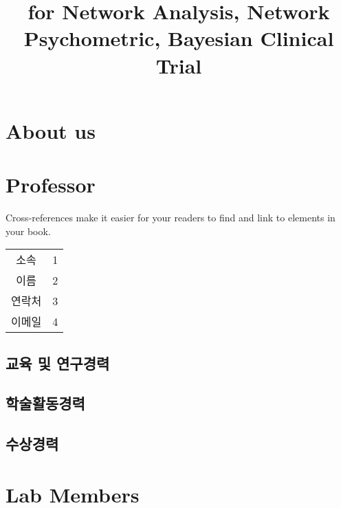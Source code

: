 \documentclass[
]{book}
\title{for Network Analysis, Network Psychometric, Bayesian Clinical Trial}
\author{}
\date{\vspace{-2.5em}}
\begin{document}
\maketitle

{
\setcounter{tocdepth}{1}
\tableofcontents
}
\hypertarget{about-us}{%
\chapter*{About us}\label{about-us}}

\hypertarget{professor}{%
\chapter*{Professor}\label{professor}}

Cross-references make it easier for your readers to find and link to elements in your book.

\begin{longtable}[]{@{}cc@{}}
\toprule
& \\
\midrule
\endhead
소속 & 1 \\
이름 & 2 \\
연락처 & 3 \\
이메일 & 4 \\
\bottomrule
\end{longtable}

\hypertarget{uxad50uxc721-uxbc0f-uxc5f0uxad6cuxacbduxb825}{%
\section*{교육 및 연구경력}\label{uxad50uxc721-uxbc0f-uxc5f0uxad6cuxacbduxb825}}

\hypertarget{uxd559uxc220uxd65cuxb3d9uxacbduxb825}{%
\section*{학술활동경력}\label{uxd559uxc220uxd65cuxb3d9uxacbduxb825}}

\hypertarget{uxc218uxc0c1uxacbduxb825}{%
\section*{수상경력}\label{uxc218uxc0c1uxacbduxb825}}

\hypertarget{lab-members}{%
\chapter*{Lab Members}\label{lab-members}}
\end{document}
